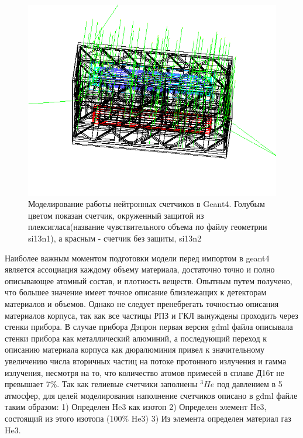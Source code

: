 \begin{figure}
	\centering
	\includegraphics[width=0.7\linewidth]{images/neutrons/neutron}
	\caption[Моделирование работы нейтронных счетчиков в Geant4.]{Моделирование работы нейтронных счетчиков в Geant4. Голубым цветом показан счетчик, окруженный защитой из плексигласа(название чувствительного объема по файлу геометрии si13n1), а красным - счетчик без защиты, si13n2}
	\label{fig:neutron}
\end{figure}

Наиболее важным моментом подготовки модели перед импортом в geant4 является ассоциация каждому объему материала, достаточно точно и полно описывающее атомный состав, и плотность веществ. Опытным путем получено, что большее значение имеет точное описание близлежащих к детекторам материалов и объемов. Однако не следует пренебрегать точностью описания материалов корпуса, так как все частицы РПЗ и ГКЛ вынуждены проходить через стенки прибора. В случае прибора Дэпрон первая версия gdml файла описывала стенки прибора как металлический алюминий, а последующий переход к описанию материала корпуса как дюралюминия привел к значительному увеличению числа вторичных частиц на потоке протонного излучения и гамма излучения, несмотря на то, что количество атомов примесей в сплаве Д16т не превышает 7\%.
Так как гелиевые счетчики заполнены $ ^3\!He $ под давлением в 5 атмосфер, для целей моделирования наполнение счетчиков описано в gdml файле таким образом:
1) Определен He3 как изотоп 
2) Определен элемент He3, состоящий из этого изотопа (100\% He3) 
3) Из элемента определен материал газ He3.

